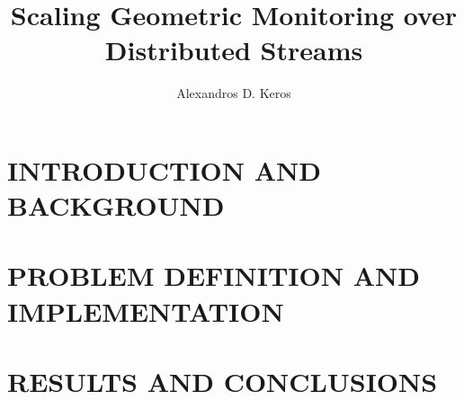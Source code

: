 \documentclass[ee, msthesis]{usuthesis}
\author{Alexandros D. Keros}
\title{Scaling Geometric Monitoring over Distributed Streams}
\begin{document}
    \preliminaries   %

    \maketitle
    \makecopyright        %

    
    

    \tableofcontents
    \listoftables
    \listoffigures

    \body  %

	\part{INTRODUCTION AND BACKGROUND}      
    
    
    \part{PROBLEM DEFINITION AND IMPLEMENTATION}
    
    
    \part{RESULTS AND CONCLUSIONS}
    
    
    


\end{document}
